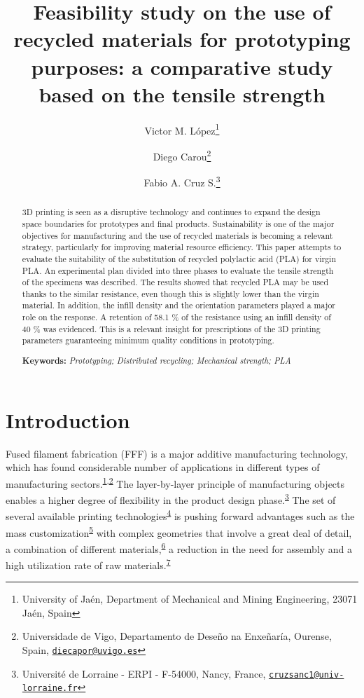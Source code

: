 \documentclass[
  12pt]{article}
\title{Feasibility study on the use of recycled materials for prototyping purposes: a comparative study based on the tensile strength}
\author{Victor M. López\footnote{University of Jaén, Department of Mechanical and Mining Engineering, 23071 Jaén, Spain} \and Diego Carou\footnote{Universidade de Vigo, Departamento de Deseño na Enxeñaría, Ourense, Spain, \href{mailto:diecapor@uvigo.es}{\nolinkurl{diecapor@uvigo.es}}} \and Fabio A. Cruz S.\footnote{Université de Lorraine - ERPI - F-54000, Nancy, France, \href{mailto:cruzsanc1@univ-lorraine.fr}{\nolinkurl{cruzsanc1@univ-lorraine.fr}}}}
\date{}
\begin{document}
\maketitle
\begin{abstract}
3D printing is seen as a disruptive technology and continues to expand the design space boundaries for prototypes and final products. Sustainability is one of the major objectives for manufacturing and the use of recycled materials is becoming a relevant strategy, particularly for improving material resource efficiency. This paper attempts to evaluate the suitability of the substitution of recycled polylactic acid (PLA) for virgin PLA. An experimental plan divided into three phases to evaluate the tensile strength of the specimens was described. The results showed that recycled PLA may be used thanks to the similar resistance, even though this is slightly lower than the virgin material. In addition, the infill density and the orientation parameters played a major role on the response. A retention of 58.1 \% of the resistance using an infill density of 40 \% was evidenced. This is a relevant insight for prescriptions of the 3D printing parameters guaranteeing minimum quality conditions in prototyping.

\textbf{Keywords:} \emph{Prototyping; Distributed recycling; Mechanical strength; PLA}
\end{abstract}

\hypertarget{introduction}{%
\section{Introduction}\label{introduction}}

Fused filament fabrication (FFF) is a major additive manufacturing technology, which has found considerable number of applications in different types of manufacturing sectors.\textsuperscript{\protect\hyperlink{ref-Singh2020d}{1},\protect\hyperlink{ref-Sartal2018}{2}}
The layer-by-layer principle of manufacturing objects enables a higher degree of flexibility in the product design phase.\textsuperscript{\protect\hyperlink{ref-Akhoundi2019}{3}}
The set of several available printing technologies\textsuperscript{\protect\hyperlink{ref-Nam2019}{4}} is pushing forward advantages such as the mass customization\textsuperscript{\protect\hyperlink{ref-Jiang2016}{5}} with complex geometries that involve a great deal of detail, a combination of different materials,\textsuperscript{\protect\hyperlink{ref-Askari2020}{6}} a reduction in the need for assembly and a high utilization rate of raw materials.\textsuperscript{\protect\hyperlink{ref-Wang2020f}{7}}
\end{document}
